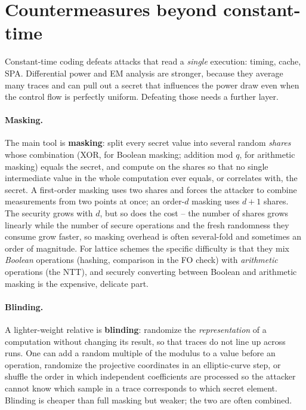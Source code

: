\section{Countermeasures beyond constant-time}

Constant-time coding defeats attacks that read a \emph{single} execution: timing,
cache, SPA. Differential power and EM analysis are stronger, because they average many
traces and can pull out a secret that influences the power draw even when the control
flow is perfectly uniform. Defeating those needs a further layer.

\paragraph{Masking.}
The main tool is \textbf{masking}: split every secret value into several random
\emph{shares} whose combination (XOR, for Boolean masking; addition mod $q$, for
arithmetic masking) equals the secret, and compute on the shares so that no single
intermediate value in the whole computation ever equals, or correlates with, the
secret. A first-order masking uses two shares and forces the attacker to combine
measurements from two points at once; an order-$d$ masking uses $d+1$ shares. The
security grows with $d$, but so does the cost -- the number of shares grows linearly
while the number of secure operations and the fresh randomness they consume grow
faster, so masking overhead is often several-fold and sometimes an order of magnitude.
For lattice schemes the specific difficulty is that they mix \emph{Boolean} operations
(hashing, comparison in the FO check) with \emph{arithmetic} operations (the NTT), and
securely converting between Boolean and arithmetic masking is the expensive, delicate
part.

\paragraph{Blinding.}
A lighter-weight relative is \textbf{blinding}: randomize the \emph{representation} of
a computation without changing its result, so that traces do not line up across runs.
One can add a random multiple of the modulus to a value before an operation, randomize
the projective coordinates in an elliptic-curve step, or shuffle the order in which
independent coefficients are processed so the attacker cannot know which sample in a
trace corresponds to which secret element. Blinding is cheaper than full masking but
weaker; the two are often combined.

